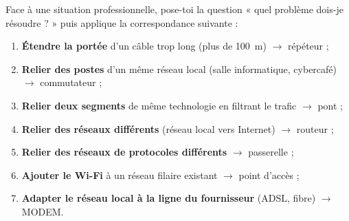 \documentclass[11pt]{article}
\newcommand{\cle}[1]{{\popxbold\color{popdark}#1}}
\begin{document}
\begin{methode}
Face à une situation professionnelle, pose-toi la question « quel problème dois-je résoudre ? » puis applique la correspondance suivante :
\begin{enumerate}
\item \textbf{Étendre la portée} d'un câble trop long (plus de \SI{100}{\meter}) $\rightarrow$ \cle{répéteur} ;
\item \textbf{Relier des postes} d'un même réseau local (salle informatique, cybercafé) $\rightarrow$ \cle{commutateur} ;
\item \textbf{Relier deux segments} de même technologie en filtrant le trafic $\rightarrow$ \cle{pont} ;
\item \textbf{Relier des réseaux différents} (réseau local vers Internet) $\rightarrow$ \cle{routeur} ;
\item \textbf{Relier des réseaux de protocoles différents} $\rightarrow$ \cle{passerelle} ;
\item \textbf{Ajouter le Wi-Fi} à un réseau filaire existant $\rightarrow$ \cle{point d'accès} ;
\item \textbf{Adapter le réseau local à la ligne du fournisseur} (ADSL, fibre) $\rightarrow$ \cle{MODEM}.
\end{enumerate}
\end{methode}
\end{document}
